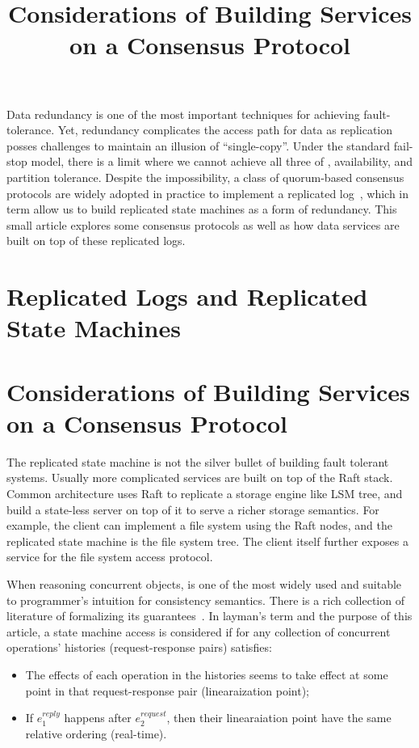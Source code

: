 



\tableofcontents

\title{Considerations of Building Services on a Consensus Protocol}
\maketitle

Data redundancy is one of the most important techniques for achieving
fault-tolerance. Yet, redundancy complicates the access path for data as
replication posses challenges to maintain an illusion of ``single-copy''.
Under the standard fail-stop model, there is a limit where we cannot achieve
all three of \Lconsistent, availability, and partition tolerance. Despite the
impossibility, a class of quorum-based consensus protocols are widely adopted
in practice to implement a replicated log~\cite{lampson1996build}, which in
term allow us to build replicated state machines as a form of redundancy.
This small article explores some consensus protocols as well as how data
services are built on top of these replicated logs.

\section{Replicated Logs and Replicated State Machines}

\section{Considerations of Building Services on a Consensus Protocol}
The replicated state machine is not the silver bullet of building fault
tolerant systems. Usually more complicated services are built on top of the
Raft stack.
Common architecture uses Raft to replicate a storage engine like LSM tree,
and build a state-less server on top of it to serve a richer storage
semantics.
For example, the client can implement a file system using the Raft nodes, and
the replicated state machine is the file system tree. The client itself
further exposes a service for the file system access protocol.

When reasoning concurrent objects, \Lconsistent is one of the most widely
used and suitable to programmer's intuition for consistency semantics. There
is a rich collection of literature of formalizing its
guarantees~\cite{herlihy1990linearizability, herlihy2011art}. In layman's
term and the purpose of this article, a state machine access is considered
\Lconsistent if for any collection of concurrent operations' histories
(request-response pairs) satisfies:
\begin{itemize}
    \item The effects of each operation in the histories seems to take effect
    at some point in that request-response pair (linearaization point);
    \item If $e_1^{reply}$ happens after $e_2^{request}$, then their
    linearaiation point have the same relative ordering (real-time).
\end{itemize}


